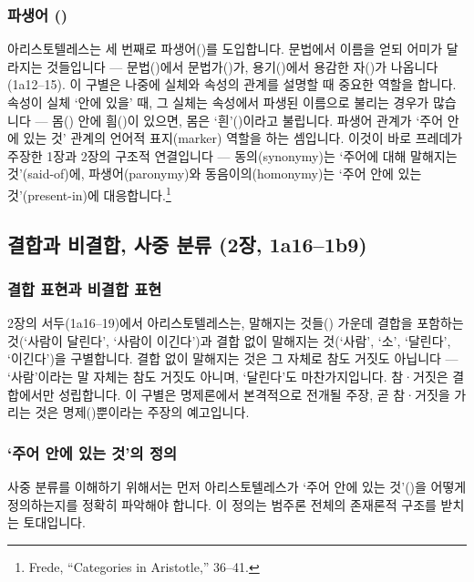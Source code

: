 \documentclass[12pt, a4paper]{article}
\begin{document}
\subsubsection{파생어 ()}

아리스토텔레스는 세 번째로 파생어()를 도입합니다. 문법에서 이름을 얻되 어미가 달라지는 것들입니다 --- 문법()에서 문법가()가, 용기()에서 용감한 자()가 나옵니다(1a12--15). 이 구별은 나중에 실체와 속성의 관계를 설명할 때 중요한 역할을 합니다. 속성이 실체 `안에 있을' 때, 그 실체는 속성에서 파생된 이름으로 불리는 경우가 많습니다 --- 몸() 안에 흼()이 있으면, 몸은 `흰'()이라고 불립니다. 파생어 관계가 `주어 안에 있는 것' 관계의 언어적 표지(marker) 역할을 하는 셈입니다. 이것이 바로 프레데가 주장한 1장과 2장의 구조적 연결입니다 --- 동의(synonymy)는 `주어에 대해 말해지는 것'(said-of)에, 파생어(paronymy)와 동음이의(homonymy)는 `주어 안에 있는 것'(present-in)에 대응합니다.\footnote{Frede, ``Categories in Aristotle,'' 36--41.}

\subsection{결합과 비결합, 사중 분류 (2장, 1a16--1b9)}

\subsubsection{결합 표현과 비결합 표현}

2장의 서두(1a16--19)에서 아리스토텔레스는, 말해지는 것들() 가운데 결합을 포함하는 것(`사람이 달린다', `사람이 이긴다')과 결합 없이 말해지는 것(`사람', `소', `달린다', `이긴다')을 구별합니다. 결합 없이 말해지는 것은 그 자체로 참도 거짓도 아닙니다 --- `사람'이라는 말 자체는 참도 거짓도 아니며, `달린다'도 마찬가지입니다. 참·거짓은 결합에서만 성립합니다. 이 구별은 명제론에서 본격적으로 전개될 주장, 곧 참·거짓을 가리는 것은 명제()뿐이라는 주장의 예고입니다.

\subsubsection{`주어 안에 있는 것'의 정의}

사중 분류를 이해하기 위해서는 먼저 아리스토텔레스가 `주어 안에 있는 것'()을 어떻게 정의하는지를 정확히 파악해야 합니다. 이 정의는 범주론 전체의 존재론적 구조를 받치는 토대입니다.
\end{document}

